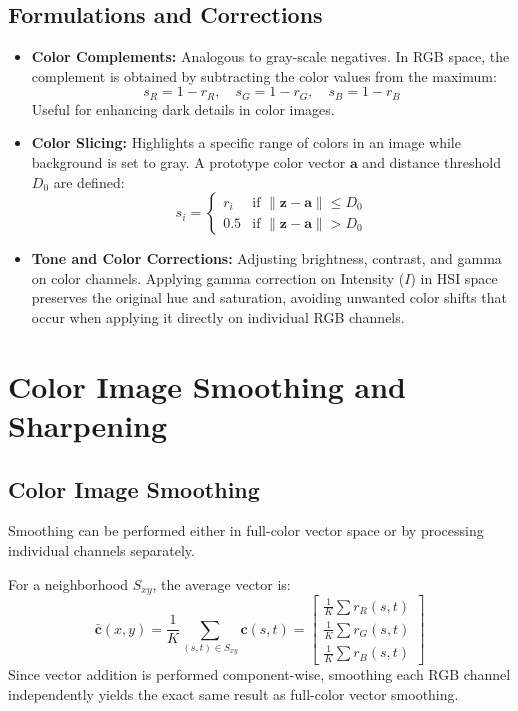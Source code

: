 \documentclass[12pt,a4paper]{article}
\begin{document}
\subsection{Formulations and Corrections}
\begin{itemize}[leftmargin=*, itemsep=3.5pt]
  \item \textbf{Color Complements:} Analogous to gray-scale negatives. In RGB space, the complement is obtained by subtracting the color values from the maximum:
    \begin{equation}
      s_R = 1 - r_R, \quad s_G = 1 - r_G, \quad s_B = 1 - r_B
    \end{equation}
    Useful for enhancing dark details in color images.
  \item \textbf{Color Slicing:} Highlights a specific range of colors in an image while background is set to gray. A prototype color vector $\mathbf{a}$ and distance threshold $D_0$ are defined:
    \begin{equation}
      s_i = \begin{cases} r_i & \text{if } \|\mathbf{z} - \mathbf{a}\| \le D_0 \\ 0.5 & \text{if } \|\mathbf{z} - \mathbf{a}\| > D_0 \end{cases}
    \end{equation}
  \item \textbf{Tone and Color Corrections:} Adjusting brightness, contrast, and gamma on color channels. Applying gamma correction on Intensity ($I$) in HSI space preserves the original hue and saturation, avoiding unwanted color shifts that occur when applying it directly on individual RGB channels.
\end{itemize}

\section{Color Image Smoothing and Sharpening}

\subsection{Color Image Smoothing}
Smoothing can be performed either in full-color vector space or by processing individual channels separately.
\par\noindent
For a neighborhood $S_{xy}$, the average vector is:
\begin{equation}
  \bar{\mathbf{c}}(x,y) = \frac{1}{K}\sum_{(s,t)\in S_{xy}} \mathbf{c}(s,t) = \begin{bmatrix}
    \frac{1}{K}\sum r_R(s,t) \\
    \frac{1}{K}\sum r_G(s,t) \\
    \frac{1}{K}\sum r_B(s,t)
  \end{bmatrix}
\end{equation}
Since vector addition is performed component-wise, smoothing each RGB channel independently yields the exact same result as full-color vector smoothing.
\end{document}

